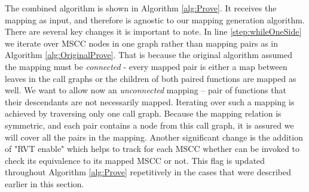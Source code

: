 The combined algorithm is shown in Algorithm \ref{alg:Prove}. It receives the mapping as input, and therefore is agnostic to our mapping generation algorithm. There are several key changes it is important to note. In line \ref{step:whileOneSide} we iterate over MSCC nodes in one graph rather than mapping pairs as in Algorithm \ref{alg:OriginalProve}. That is because the original algorithm assumed the mapping must be \emph{connected} - every mapped pair is either a map between leaves in the call graphs or the children of both paired functions are mapped as well. We want to allow now an \emph{unconnected} mapping – pair of functions that their descendants are not necessarily mapped. Iterating over such a mapping is achieved by traversing only one call graph. Because the mapping relation is symmetric, and each pair contains a node from this call graph, it is assured we will cover all the pairs in the mapping. Another significant change is the addition of "RVT enable" which helps to track for each MSCC whether  can be invoked to check its equivalence to its mapped MSCC or not. This flag is updated throughout Algorithm \ref{alg:Prove} repetitively in the cases that were described earlier in this section.  

